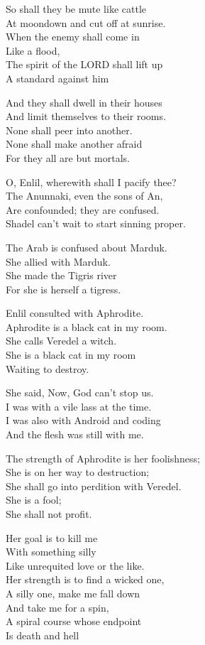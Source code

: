 \documentclass[
]{book}
\begin{document}
So shall they be mute like cattle\\
At moondown and cut off at sunrise.\\
When the enemy shall come in\\
Like a flood,\\
The spirit of the LORD shall lift up\\
A standard against him

And they shall dwell in their houses\\
And limit themselves to their rooms.\\
None shall peer into another.\\
None shall make another afraid\\
For they all are but mortals.

O, Enlil, wherewith shall I pacify thee?\\
The Anunnaki, even the sons of An,\\
Are confounded; they are confused.\\
Shadel can't wait to start sinning proper.

The Arab is confused about Marduk.\\
She allied with Marduk.\\
She made the Tigris river\\
For she is herself a tigress.

Enlil consulted with Aphrodite.\\
Aphrodite is a black cat in my room.\\
She calls Veredel a witch.\\
She is a black cat in my room\\
Waiting to destroy.

She said, Now, God can't stop us.\\
I was with a vile lass at the time.\\
I was also with Android and coding\\
And the flesh was still with me.

The strength of Aphrodite is her foolishness;\\
She is on her way to destruction;\\
She shall go into perdition with Veredel.\\
She is a fool;\\
She shall not profit.

Her goal is to kill me\\
With something silly\\
Like unrequited love or the like.\\
Her strength is to find a wicked one,\\
A silly one, make me fall down\\
And take me for a spin,\\
A spiral course whose endpoint\\
Is death and hell
\end{document}
